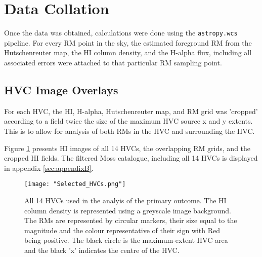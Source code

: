 \section{Data Collation}
\label{sec:collation}

Once the data was obtained, calculations were done using the \verb|astropy.wcs| pipeline. For every RM point in the sky, the estimated foreground RM from the Hutschenreuter map, the HI column density, and the H-alpha flux, including all associated errors were attached to that particular RM sampling point.

\subsection{HVC Image Overlays}
\label{ssec:hvc_snapshot}

For each HVC, the HI, H-alpha, Hutschenreuter map, and RM grid was 'cropped' according to a field twice the size of the maximum HVC source x and y extents. This is to allow for analysis of both RMs in the HVC and surrounding the HVC.


Figure \ref{fig:all_hvcs} presents HI images of all 14 HVCs, the overlapping RM grids, and the cropped HI fields. The filtered Moss catalogue, including all 14 HVCs is displayed in appendix \ref{sec:appendixB}.

\begin{figure}
    \texttt{[image: "Selected\_HVCs.png"]}
    \centering
    \caption{All 14 HVCs used in the analyis of the primary outcome. The HI column density is represented using a greyscale image background. The RMs are represented by circular markers, their size equal to the magnitude and the colour representative of their sign with Red being positive. The black circle is the maximum-extent HVC area and the black 'x' indicates the centre of the HVC.}
    \label{fig:all_hvcs}
\end{figure}

